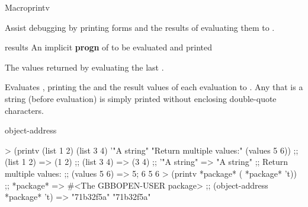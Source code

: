 \documentclass[10pt,twoside,english,pdftex]{article}
\begin{document}
\begin{functiondoc}{Macro}{printv}{\superstar{} 
    \returns{} \superstar}
% 

\fnsyntax

\fnpurpose Assist debugging by printing forms and the results of
evaluating them to .

\fnpackage {}

\fnmodule {}

\fnargs
\begin{args}{results}
\arg[forms] An implicit \textbf{progn} of  to be
evaluated and printed  
\end{args}

\fnreturns The values returned by evaluating the last .

\fndescription Evaluates , printing the  and the
result values of each evaluation to .  Any 
that is a string (before evaluation) is simply printed without enclosing
double-quote characters.

\begin{alsos}{object-address}
\end{alsos}

%
\fnexamples
%
\W\supp
\begin{example}
> (printv (list 1 2) (list 3 4) '"A string" 
          "Return multiple values:" (values 5 6))
;;  (list 1 2) => (1 2)
;;  (list 3 4) => (3 4)
;;  '"A string" => "A string"
;; Return multiple values:
;;  (values 5 6) => 5; 6
5
6\goodpagebreak
> (printv *package* ( *package* 't))
;;  *package* => #<The GBBOPEN-USER package>
;;  (object-address *package* 't) => "71b32f5a"
"71b32f5a"
\end{example}

\end{functiondoc}

\end{document}
